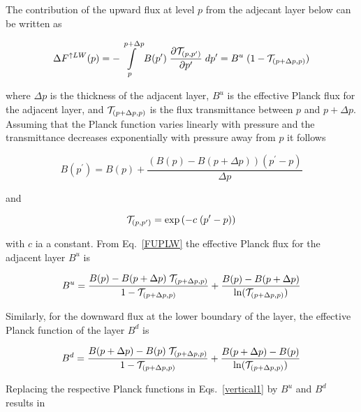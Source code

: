 The contribution of the upward flux at level $p$ from the adjecant layer below can be written as

\begin{equation} \label{FUPLW}
\Delta F^{\uparrow LW}(p) = -\int\limits^{p+\Delta p}_{p} B(p^{\prime}) \; \frac{\partial
{\cal T}_{(p,p^{\prime})}}{\partial p^{\prime}} \; dp^{\prime} = B^u \; (1-{\cal T}_{
(p+\Delta p, p)})
\end{equation}

where $\Delta p$ is the thickness of the adjacent layer, $B^u$ is the effective Planck flux for the
adjacent layer, and  ${\cal T}_{(p+\Delta p, p)}$ is the flux transmittance between $p$ and $p
+\Delta p$. Assuming that the Planck function varies linearly with pressure and the
transmittance decreases exponentially with pressure away from $p$ it follows

\begin{equation}
B(p^{\prime})= B(p) + \frac{(B(p)-B(p+\Delta p)) (p^{\prime} - p)}{\Delta p}
\end{equation}

and

\begin{equation}
{\cal T}_{(p, p^{\prime})} = \exp{(-c\; (p^{\prime}-p))}
\end{equation}

with $c$ ia a constant. From Eq.~\ref{FUPLW} the effective Planck flux for the adjacent layer
$B^u$ is 

\begin{equation}
B^u=\frac{B(p)-B(p+\Delta p)\;{\cal T}_{(p+\Delta p, p)}}{1-{\cal T}_{(p+\Delta p, p)}}
+\frac{B(p)-
B(p+\Delta p)}{\ln({\cal T}_{(p+\Delta p, p)})}
\end{equation}

Similarly, for the downward flux at the lower boundary of the layer, the effective Planck
function of the layer $B^d$ is 

\begin{equation}
B^d=\frac{B(p+\Delta p)-B(p)\;{\cal T}_{(p+\Delta p, p)}}{1-{\cal T}_{(p+\Delta p, p)}}
+\frac{B(p+\Delta
p)-B(p)}{\ln({\cal T}_{(p+\Delta p, p)})}
\end{equation}

Replacing the respective Planck functions in Eqs.~\ref{vertical1} by $B^u$ and $B^d$ results
in


